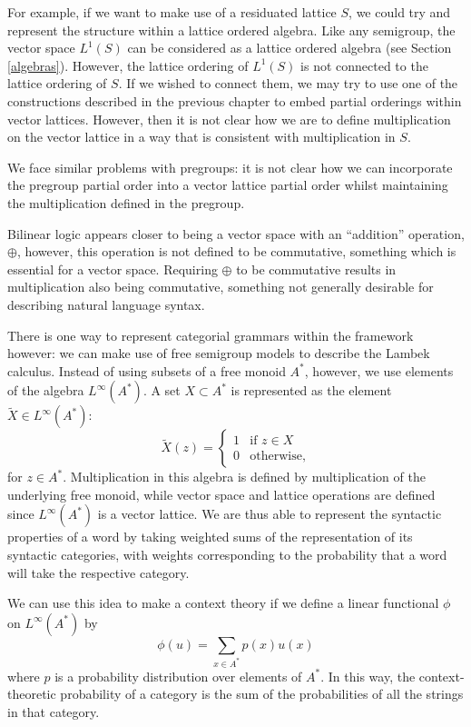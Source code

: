 For example, if we want to make use of a residuated lattice $S$, we could try and represent the structure within a lattice ordered algebra. Like any semigroup, the vector space $L^1(S)$ can be considered as a lattice ordered algebra (see Section \ref{algebras}). However, the lattice ordering of $L^1(S)$ is not connected to the lattice ordering of $S$. If we wished to connect them, we may try to use one of the constructions described in the previous chapter to embed partial orderings within vector lattices. However, then it is not clear how we are to define multiplication on the vector lattice in a way that is consistent with multiplication in $S$.

We face similar problems with pregroups: it is not clear how we can incorporate the pregroup partial order into a vector lattice partial order whilst maintaining the multiplication defined in the pregroup.

Bilinear logic appears closer to being a vector space with an ``addition'' operation, $\oplus$, however, this operation is not defined to be commutative, something which is essential for a vector space. Requiring $\oplus$ to be commutative results in multiplication also being commutative, something not generally desirable for describing natural language syntax.

There is one way to represent categorial grammars within the framework however: we can make use of free semigroup models to describe the Lambek calculus. Instead of using subsets of a free monoid $A^*$, however, we use elements of the algebra $L^\infty(A^*)$. A set $X \subset A^*$ is represented as the element $\tilde{X} \in L^\infty(A^*)$:
$$\tilde{X}(z) = \begin{cases}
1 & \text{if } z\in X\\
0 & \text{otherwise,}
\end{cases}$$
for $z \in A^*$. Multiplication in this algebra is defined by multiplication of the underlying free monoid, while vector space and lattice operations are defined since $L^\infty(A^*)$ is a vector lattice. We are thus able to represent the syntactic properties of a word by taking weighted sums of the representation of its syntactic categories, with weights corresponding to the probability that a word will take the respective category.

We can use this idea to make a context theory if we define a linear functional $\phi$ on $L^\infty(A^*)$ by
$$\phi(u) = \sum_{x \in A^*} p(x)u(x)$$
where $p$ is a probability distribution over elements of $A^*$. In this way, the context-theoretic probability of a category is the sum of the probabilities of all the strings in that category.


